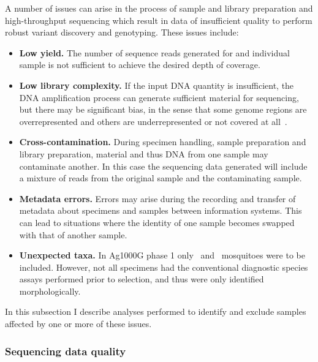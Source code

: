 \documentclass[a4paper,11pt,abstracton,hidelinks]{scrartcl}
\begin{document}
%
A number of issues can arise in the process of sample and library preparation and high-throughput sequencing which result in data of insufficient quality to perform robust variant discovery and genotyping.
%
These issues include:
%
\begin{itemize}
%
\item \textbf{Low yield.} The number of sequence reads generated for and individual sample is not sufficient to achieve the desired depth of coverage.
%
\item \textbf{Low library complexity.} If the input DNA quantity is insufficient, the DNA amplification process can generate sufficient material for sequencing, but there may be significant bias, in the sense that some genome regions are overrepresented and others are underrepresented or not covered at all~\parencite{Head2014}.
%
\item \textbf{Cross-contamination.} During specimen handling, sample preparation and library preparation, material and thus DNA from one sample may contaminate another.
%
In this case the sequencing data generated will include a mixture of reads from the original sample and the contaminating sample.
%
\item \textbf{Metadata errors.} Errors may arise during the recording and transfer of metadata about specimens and samples between information systems.
%
This can lead to situations where the identity of one sample becomes swapped with that of another sample.
%
\item \textbf{Unexpected taxa.} In Ag1000G phase 1 only \agam\ and \acol\ mosquitoes were to be included.
%
However, not all specimens had the conventional diagnostic species assays performed prior to selection, and thus were only identified morphologically.
\end{itemize}
%
In this subsection I describe analyses performed to identify and exclude samples affected by one or more of these issues.


\subsubsection{Sequencing data quality}
\end{document}
